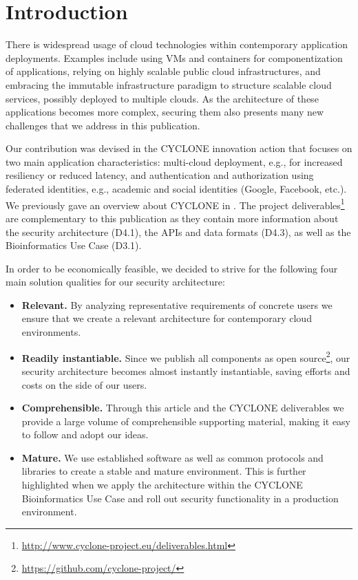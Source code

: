 \documentclass{llncs}
\begin{document}
\section{Introduction}

There is widespread usage of cloud technologies within contemporary application deployments. Examples include using VMs and containers for componentization of applications, relying on highly scalable public cloud infrastructures, and embracing the immutable infrastructure paradigm to structure scalable cloud services, possibly deployed to multiple clouds. As the architecture of these applications becomes more complex, securing them also presents many new challenges that we address in this publication.

Our contribution was devised in the CYCLONE innovation action that focuses on two main application characteristics: multi-cloud deployment, e.g., for increased resiliency or reduced latency, and authentication and authorization using federated identities, e.g., academic and social identities (Google, Facebook, etc.). We previously gave an overview about CYCLONE in \cite{SZDABLLB15}. The project deliverables\footnote{\url{http://www.cyclone-project.eu/deliverables.html}} are complementary to this publication as they contain more information about the security architecture (D4.1), the APIs and data formats (D4.3), as well as the Bioinformatics Use Case (D3.1).

In order to be economically feasible, we decided to strive for the following four main solution qualities for our security architecture:

\begin{itemize}
	\item \textbf{Relevant.} By analyzing representative requirements of concrete users we ensure that we create a relevant architecture for contemporary cloud environments.
	\item \textbf{Readily instantiable.} Since we publish all components as open source\footnote{\url{https://github.com/cyclone-project/}}, our security architecture becomes almost instantly instantiable, saving efforts and costs on the side of our users.
	\item \textbf{Comprehensible.} Through this article and the CYCLONE deliverables we provide a large volume of comprehensible supporting material, making it easy to follow and adopt our ideas.
	\item \textbf{Mature.} We use established software as well as common protocols and libraries to create a stable and mature environment. This is further highlighted when we apply the architecture within the CYCLONE Bioinformatics Use Case and roll out security functionality in a production environment.
\end{itemize}
\end{document}

